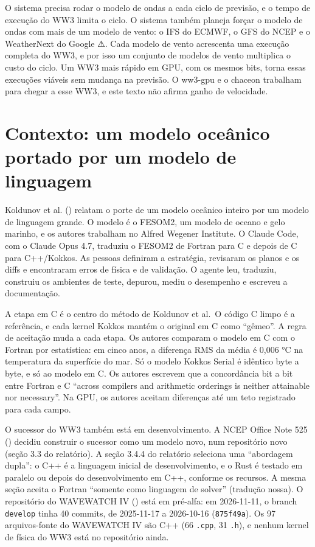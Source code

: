 \documentclass[10pt,a4paper,]{article}
\begin{document}
O sistema precisa rodar o modelo de ondas a cada ciclo de previsão, e o
tempo de execução do WW3 limita o ciclo. O sistema também planeja forçar
o modelo de ondas com mais de um modelo de vento: o IFS do ECMWF, o GFS
do NCEP e o WeatherNext do Google ⚠. Cada modelo de vento acrescenta uma
execução completa do WW3, e por isso um conjunto de modelos de vento
multiplica o custo do ciclo. Um WW3 mais rápido em GPU, com os mesmos
bits, torna essas execuções viáveis sem mudança na previsão. O ww3-gpu e
o chaceon trabalham para chegar a esse WW3, e este texto não afirma
ganho de velocidade.

\setcounter{section}{-1}

\section{Contexto: um modelo oceânico portado por um modelo de
linguagem}\label{sec:context}

Koldunov et al. ()
relatam o porte de um modelo oceânico inteiro por um modelo de linguagem
grande. O modelo é o FESOM2, um modelo de oceano e gelo marinho, e os
autores trabalham no Alfred Wegener Institute. O Claude Code, com o
Claude Opus 4.7, traduziu o FESOM2 de Fortran para C e depois de C para
C++/Kokkos. As pessoas definiram a estratégia, revisaram os planos e os
diffs e encontraram erros de física e de validação. O agente leu,
traduziu, construiu os ambientes de teste, depurou, mediu o desempenho e
escreveu a documentação.

A etapa em C é o centro do método de Koldunov et al.~O código C limpo é
a referência, e cada kernel Kokkos mantém o original em C como
``gêmeo''. A regra de aceitação muda a cada etapa. Os autores comparam o
modelo em C com o Fortran por estatística: em cinco anos, a diferença
RMS da média é 0,006 °C na temperatura da superfície do mar. Só o modelo
Kokkos Serial é idêntico byte a byte, e só ao modelo em C. Os autores
escrevem que a concordância bit a bit entre Fortran e C ``across
compilers and arithmetic orderings is neither attainable nor
necessary''. Na GPU, os autores aceitam diferenças até um teto
registrado para cada campo.

O sucessor do WW3 também está em desenvolvimento. A NCEP Office Note 525
() decidiu construir o sucessor como um
modelo novo, num repositório novo (seção 3.3 do relatório). A seção
3.4.4 do relatório seleciona uma ``abordagem dupla'': o C++ é a
linguagem inicial de desenvolvimento, e o Rust é testado em paralelo ou
depois do desenvolvimento em C++, conforme os recursos. A mesma seção
aceita o Fortran ``somente como linguagem de solver'' (tradução nossa).
O repositório do WAVEWATCH IV () está em pré-alfa: em 2026-11-11, o branch
\texttt{develop} tinha 40 commits, de 2025-11-17 a 2026-10-16
(\texttt{875f49a}). Os 97 arquivos-fonte do WAVEWATCH IV são C++ (66
\texttt{.cpp}, 31 \texttt{.h}), e nenhum kernel de física do WW3 está no
repositório ainda.
\end{document}
